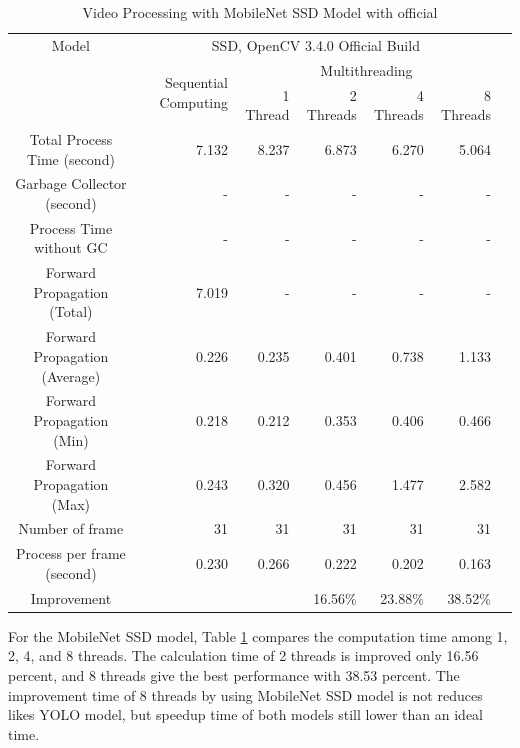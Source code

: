             \begin{table}[!htp]\centering
                \scriptsize
                \begin{tabular}{lrrrrrrr}\toprule
                    \multicolumn{2}{c}{Model} &\multicolumn{5}{c}{SSD, OpenCV 3.4.0 Official Build} \\\cmidrule{1-7}
                    \multicolumn{2}{c}{\multirow{2}{*}{}} &\multirow{2}{*}{Sequential Computing} &\multicolumn{4}{c}{Multithreading} \\\cmidrule{4-7}
                    & & &1 Thread &2 Threads &4 Threads &8 Threads \\\midrule
                    \multicolumn{2}{c}{Total Process Time (second)} &7.132 &8.237 &6.873 &6.270 &5.064 \\
                    \multicolumn{2}{c}{Garbage Collector (second)} &- &- &- &- &- \\
                    \multicolumn{2}{c}{Process Time without GC} &- &- &- &- &- \\
                    \multicolumn{2}{c}{Forward Propagation (Total)} &7.019 &- &- &- &- \\
                    \multicolumn{2}{c}{Forward Propagation (Average)} &0.226 &0.235 &0.401 &0.738 &1.133 \\
                    \multicolumn{2}{c}{Forward Propagation (Min)} &0.218 &0.212 &0.353 &0.406 &0.466 \\
                    \multicolumn{2}{c}{Forward Propagation (Max)} &0.243 &0.320 &0.456 &1.477 &2.582 \\
                    \multicolumn{2}{c}{Number of frame} &31 &31 &31 &31 &31 \\
                    \multicolumn{2}{c}{Process per frame (second)} &0.230 &0.266 &0.222 &0.202 &0.163 \\
                    \multicolumn{2}{c}{Improvement} & & &16.56\% &23.88\% &38.52\% \\
                    \bottomrule
                \end{tabular}

                \caption{Video Processing with MobileNet SSD Model with official}\label{ssd:official-performace}
            \end{table}

            For the MobileNet SSD model, Table \ref{ssd:official-performace} compares the computation time among 1, 2, 4, and 8 threads.
            The calculation time of 2 threads is improved only 16.56 percent, and 8 threads give the best performance with 38.53 percent.
            The improvement time of 8 threads by using MobileNet SSD model is not reduces likes YOLO model,
            but speedup time of both models still lower than an ideal time.

